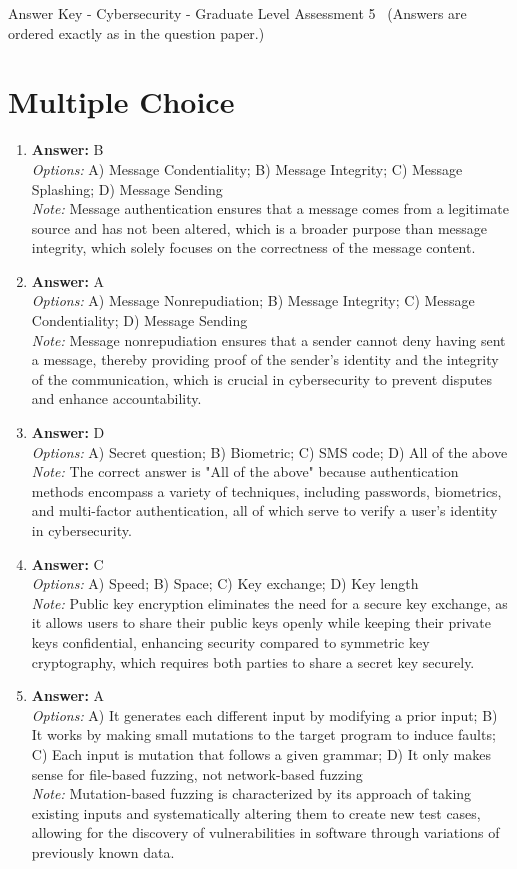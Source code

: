\documentclass[12pt]{article}
\begin{document}
\begin{center}
Answer Key - Cybersecurity - Graduate Level Assessment 5 \
\small (Answers are ordered exactly as in the question paper.)
\end{center}

\section*{Multiple Choice}
\begin{enumerate}[label=\arabic*.]
\item \textbf{Answer:} B
\\ \textit{Options:} A) Message Condentiality; B) Message Integrity; C) Message Splashing; D) Message Sending
\\ \textit{Note:} Message authentication ensures that a message comes from a legitimate source and has not been altered, which is a broader purpose than message integrity, which solely focuses on the correctness of the message content.
\item \textbf{Answer:} A
\\ \textit{Options:} A) Message Nonrepudiation; B) Message Integrity; C) Message Condentiality; D) Message Sending
\\ \textit{Note:} Message nonrepudiation ensures that a sender cannot deny having sent a message, thereby providing proof of the sender's identity and the integrity of the communication, which is crucial in cybersecurity to prevent disputes and enhance accountability.
\item \textbf{Answer:} D
\\ \textit{Options:} A) Secret question; B) Biometric; C) SMS code; D) All of the above
\\ \textit{Note:} The correct answer is "All of the above" because authentication methods encompass a variety of techniques, including passwords, biometrics, and multi-factor authentication, all of which serve to verify a user's identity in cybersecurity.
\item \textbf{Answer:} C
\\ \textit{Options:} A) Speed; B) Space; C) Key exchange; D) Key length
\\ \textit{Note:} Public key encryption eliminates the need for a secure key exchange, as it allows users to share their public keys openly while keeping their private keys confidential, enhancing security compared to symmetric key cryptography, which requires both parties to share a secret key securely.
\item \textbf{Answer:} A
\\ \textit{Options:} A) It generates each different input by modifying a prior input; B) It works by making small mutations to the target program to induce faults; C) Each input is mutation that follows a given grammar; D) It only makes sense for file-based fuzzing, not network-based fuzzing
\\ \textit{Note:} Mutation-based fuzzing is characterized by its approach of taking existing inputs and systematically altering them to create new test cases, allowing for the discovery of vulnerabilities in software through variations of previously known data.
\end{enumerate}
\end{document}
